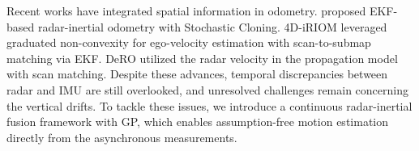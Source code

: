 Recent works have integrated spatial information in odometry. \citet{michalczyk2022tightly} proposed \ac{EKF}-based radar-inertial odometry with Stochastic Cloning.
4D-iRIOM \cite{zhuang20234d} leveraged graduated non-convexity for ego-velocity estimation with scan-to-submap matching via \ac{EKF}.
DeRO \cite{do2024dero} utilized the radar velocity in the propagation model with scan matching.
Despite these advances, temporal discrepancies between radar and \ac{IMU} are still overlooked, and unresolved challenges remain concerning the vertical drifts. 
To tackle these issues, we introduce a continuous radar-inertial fusion framework with \ac{GP}, which enables assumption-free motion estimation directly from the asynchronous measurements.
